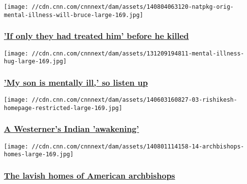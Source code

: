 \href{http://www.cnn.com/interactive/2014/08/health/mental-illness-treatment/index.html}{}

\texttt{[image: //cdn.cnn.com/cnnnext/dam/assets/140804063120-natpkg-orig-mental-illness-will-bruce-large-169.jpg]}

\hypertarget{if-only-they-had-treated-him-before-he-killed}{%
\subsubsection{\texorpdfstring{\href{http://www.cnn.com/interactive/2014/08/health/mental-illness-treatment/index.html}{'If
only they had treated him' before he
killed}}{'If only they had treated him' before he killed}}\label{if-only-they-had-treated-him-before-he-killed}}

\href{http://www.cnn.com/interactive/2013/12/health/mentally-ill-son/}{}

\texttt{[image: //cdn.cnn.com/cnnnext/dam/assets/131209194811-mental-illness-hug-large-169.jpg]}

\hypertarget{my-son-is-mentally-ill-so-listen-up}{%
\subsubsection{\texorpdfstring{\href{http://www.cnn.com/interactive/2013/12/health/mentally-ill-son/}{'My
son is mentally ill,' so listen
up}}{'My son is mentally ill,' so listen up}}\label{my-son-is-mentally-ill-so-listen-up}}

\href{http://www.cnn.com/interactive/2014/06/world/rishikesh/index.html}{}

\texttt{[image: //cdn.cnn.com/cnnnext/dam/assets/140603160827-03-rishikesh-homepage-restricted-large-169.jpg]}

\hypertarget{a-westerners-indian-awakening}{%
\subsubsection{\texorpdfstring{\href{http://www.cnn.com/interactive/2014/06/world/rishikesh/index.html}{A
Westerner's Indian
'awakening'}}{A Westerner's Indian 'awakening'}}\label{a-westerners-indian-awakening}}

\href{http://www.cnn.com/interactive/2014/08/us/american-archbishops-lavish-homes/}{}

\texttt{[image: //cdn.cnn.com/cnnnext/dam/assets/140801114158-14-archbishops-homes-large-169.jpg]}

\hypertarget{the-lavish-homes-of-american-archbishops}{%
\subsubsection{\texorpdfstring{\href{http://www.cnn.com/interactive/2014/08/us/american-archbishops-lavish-homes/}{The
lavish homes of American
archbishops}}{The lavish homes of American archbishops}}\label{the-lavish-homes-of-american-archbishops}}

